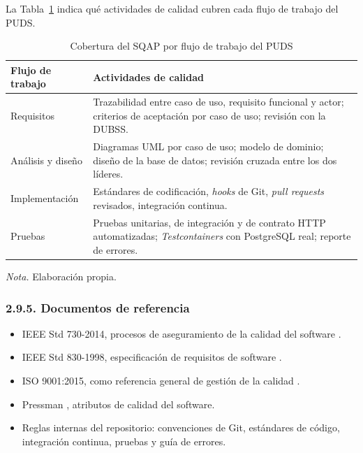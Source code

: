 La Tabla~\ref{tab:cobertura_sqap} indica qué actividades de calidad cubren cada flujo de trabajo del PUDS.

\begin{table}[H]
\caption{Cobertura del SQAP por flujo de trabajo del PUDS}
\label{tab:cobertura_sqap}
\begin{threeparttable}
\begin{tabular}{>{\raggedright\arraybackslash}p{3.2cm} >{\raggedright\arraybackslash}p{9.6cm}}
\toprule
Flujo de trabajo & Actividades de calidad \\
\midrule
Requisitos & Trazabilidad entre caso de uso, requisito funcional y actor; criterios de aceptación por caso de uso; revisión con la DUBSS. \\
Análisis y diseño & Diagramas UML por caso de uso; modelo de dominio; diseño de la base de datos; revisión cruzada entre los dos líderes. \\
Implementación & Estándares de codificación, \textit{hooks} de Git, \textit{pull requests} revisados, integración continua. \\
Pruebas & Pruebas unitarias, de integración y de contrato HTTP automatizadas; \textit{Testcontainers} con PostgreSQL real; reporte de errores. \\
\bottomrule
\end{tabular}
\begin{tablenotes}
\item \textit{Nota.} Elaboración propia.
\end{tablenotes}
\end{threeparttable}
\end{table}

\subsubsection{2.9.5. Documentos de referencia}

\begin{itemize}
    \item IEEE Std 730-2014, procesos de aseguramiento de la calidad del software \parencite{ieee730_2014}.
    \item IEEE Std 830-1998, especificación de requisitos de software \parencite{ieee830_1998}.
    \item ISO 9001:2015, como referencia general de gestión de la calidad \parencite{iso9001_2015}.
    \item Pressman \parencite{pressman2010ingenieria}, atributos de calidad del software.
    \item Reglas internas del repositorio: convenciones de Git, estándares de código, integración continua, pruebas y guía de errores.
\end{itemize}

